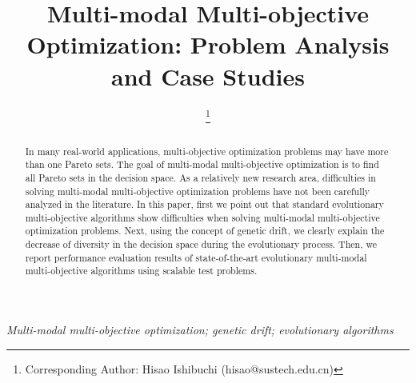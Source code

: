\documentclass[conference]{IEEEtran}
\begin{document}
\title{Multi-modal Multi-objective Optimization: Problem Analysis and Case Studies
}
\author{
\thanks{Corresponding Author: Hisao Ishibuchi (hisao@sustech.edu.cn)}
}

\maketitle

\begin{abstract}
In many real-world applications, multi-objective optimization problems may have more than one Pareto sets. The goal of multi-modal multi-objective optimization is to find all Pareto sets in the decision space. As a relatively new research area, difficulties in solving multi-modal multi-objective optimization problems have not been carefully analyzed in the literature. In this paper, first we point out that standard evolutionary multi-objective algorithms show difficulties when solving multi-modal multi-objective optimization problems. Next, using the concept of genetic drift, we clearly explain the decrease of diversity in the decision space during the evolutionary process. Then, we report performance evaluation results of state-of-the-art evolutionary multi-modal multi-objective algorithms using scalable test problems.
\end{abstract}

\bigskip %

\begin{IEEEkeywords}
\textit{Multi-modal multi-objective optimization; genetic drift; evolutionary algorithms}
\end{IEEEkeywords}
\end{document}
